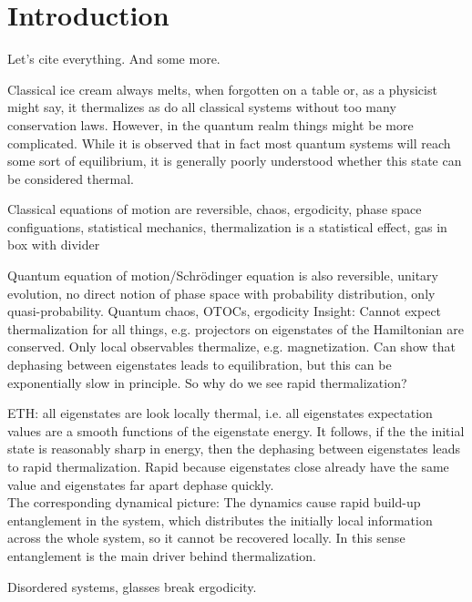 \chapter{Introduction}\label{ch:introduction}
Let's cite everything\cite{braemerPairLocalizationDipolar2022,eulerMetronomeSpinStabilizes2024,franzEmergentPairLocalization2022,franzObservationUniversalRelaxation2023,geierTimereversalDipolarQuantum2024,braemerClusterTruncatedWigner2024}. And some more\cite{luitzHowSmallQuantum2017,nandkishoreManyBodyLocalized2017}.

Classical ice cream always melts, when forgotten on a table or, as a physicist might say, it thermalizes as do all classical systems without too many conservation laws. However, in the quantum realm things might be more complicated. While it is observed that in fact most quantum systems will reach some sort of equilibrium, it is generally poorly understood whether this state can be considered thermal.  

Classical equations of motion are reversible, chaos, ergodicity, phase space configuations, statistical mechanics, thermalization is a statistical effect, gas in box with divider

Quantum equation of motion/Schrödinger equation is also reversible, unitary evolution, no direct notion of phase space with probability distribution, only quasi-probability. 
Quantum chaos, OTOCs, ergodicity
Insight: Cannot expect thermalization for all things, e.g. projectors on eigenstates of the Hamiltonian are conserved. Only local observables thermalize, e.g. magnetization.
Can show that dephasing between eigenstates leads to equilibration, but this can be exponentially slow in principle. So why do we see rapid thermalization?

ETH: all eigenstates are look locally thermal, i.e. all eigenstates expectation values are a smooth functions of the eigenstate energy. It follows, if the the initial state is reasonably sharp in energy, then the dephasing between eigenstates leads to rapid thermalization. Rapid because eigenstates close already have the same value and eigenstates far apart dephase quickly.\\
The corresponding dynamical picture: The dynamics cause rapid build-up entanglement in the system, which distributes the initially local information across the whole system, so it cannot be recovered locally. In this sense entanglement is the main driver behind thermalization.

Disordered systems, glasses break ergodicity.

